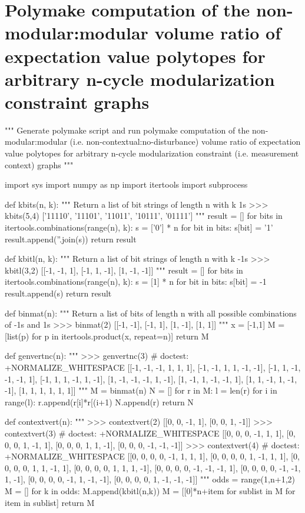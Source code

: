\section*{Polymake computation of the non-modular:modular volume ratio of expectation value polytopes for arbitrary n-cycle modularization constraint graphs}
\begin{python}
"""
Generate polymake script and run polymake computation of the
non-modular:modular (i.e. non-contextual:no-disturbance) volume ratio
of expectation value polytopes for arbitrary n-cycle modularization
constraint (i.e. measurement context) graphs
"""

import sys
import numpy as np
import itertools
import subprocess

def kbits(n, k):
    """
    Return a list of bit strings of length n with k 1s
    >>> kbits(5,4)
    ['11110', '11101', '11011', '10111', '01111']
    """
    result = []
    for bits in itertools.combinations(range(n), k):
        s = ['0'] * n
        for bit in bits:
            s[bit] = '1'
        result.append(''.join(s))
    return result

def kbitl(n, k):
    """
    Return a list of bit strings of length n with k -1s
    >>> kbitl(3,2)
    [[-1, -1, 1], [-1, 1, -1], [1, -1, -1]]
    """
    result = []
    for bits in itertools.combinations(range(n), k):
        s = [1] * n
        for bit in bits:
            s[bit] = -1
        result.append(s)
    return result

def binmat(n):
    """
    Return a list of bits of length n with all possible
    combinations of -1s and 1s
    >>> binmat(2)
    [[-1, -1], [-1, 1], [1, -1], [1, 1]]
    """
    x = [-1,1]
    M = [list(p) for p in itertools.product(x, repeat=n)]
    return M

def genvertnc(n):
    """
    >>> genvertnc(3) # doctest: +NORMALIZE_WHITESPACE
    [[-1, -1, -1, 1, 1, 1], [-1, -1, 1, 1, -1, -1],
    [-1, 1, -1, -1, -1, 1], [-1, 1, 1, -1, 1, -1],
    [1, -1, -1, -1, 1, -1], [1, -1, 1, -1, -1, 1],
    [1, 1, -1, 1, -1, -1], [1, 1, 1, 1, 1, 1]]
    """
    M = binmat(n)
    N = []
    for r in M:
        l = len(r)
        for i in range(l):
            r.append(r[i]*r[(i+1) %
        N.append(r)
    return N

def contextvert(n):
    """
    >>> contextvert(2)
    [[0, 0, -1, 1], [0, 0, 1, -1]]
    >>> contextvert(3) # doctest: +NORMALIZE_WHITESPACE
    [[0, 0, 0, -1, 1, 1], [0, 0, 0, 1, -1, 1],
    [0, 0, 0, 1, 1, -1], [0, 0, 0, -1, -1, -1]]
    >>> contextvert(4) # doctest: +NORMALIZE_WHITESPACE
    [[0, 0, 0, 0, -1, 1, 1, 1], [0, 0, 0, 0, 1, -1, 1, 1],
    [0, 0, 0, 0, 1, 1, -1, 1], [0, 0, 0, 0, 1, 1, 1, -1],
    [0, 0, 0, 0, -1, -1, -1, 1], [0, 0, 0, 0, -1, -1, 1, -1],
    [0, 0, 0, 0, -1, 1, -1, -1], [0, 0, 0, 0, 1, -1, -1, -1]]
    """
    odds = range(1,n+1,2)
    M = []
    for k in odds:
        M.append(kbitl(n,k))
    M = [[0]*n+item for sublist in M for item in sublist]
    return M


\end{python}
